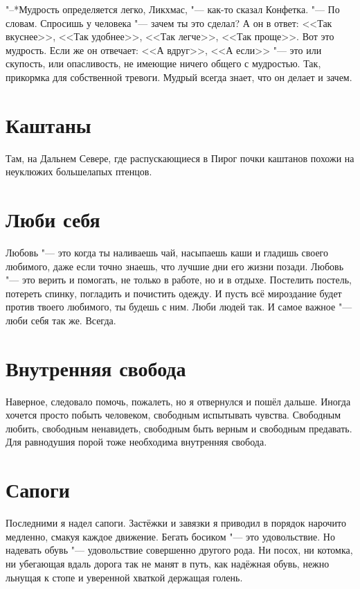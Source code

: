 \documentclass[a4paper,10pt]{book}
\begin{document}
"--*Мудрость определяется легко, Ликхмас, "--- как-то сказал Конфетка. "--- По 
словам. Спросишь у человека "--- зачем ты это сделал? А он в ответ: <<Так 
вкуснее>>, <<Так удобнее>>, <<Так легче>>, <<Так проще>>. Вот это мудрость. 
Если 
же он отвечает: <<А вдруг>>, <<А если>> "--- это или скупость, или опасливость, 
не имеющие ничего общего с мудростью. Так, прикормка для собственной тревоги. 
Мудрый всегда знает, что он делает и зачем.
 
 \section{Каштаны}

 Там, на Дальнем Севере, где распускающиеся в Пирог почки каштанов похожи на 
неуклюжих большелапых птенцов.
 
\section{Люби себя}
 
Любовь "--- это когда ты наливаешь чай, насыпаешь каши и гладишь своего 
любимого, даже если точно знаешь, что лучшие дни его жизни позади.
Любовь "--- это верить и помогать, не только в работе, но и в отдыхе. Постелить 
постель, потереть спинку, погладить и почистить одежду. И пусть всё мироздание 
будет против твоего любимого, ты будешь с ним. Люби людей так. И самое важное 
"--- люби себя так же. Всегда.
 
 \section{Внутренняя свобода}

  Наверное, следовало помочь, пожалеть, но я отвернулся и пошёл дальше. Иногда 
хочется просто побыть человеком, свободным испытывать чувства. Свободным 
любить, 
свободным ненавидеть, свободным быть верным и свободным предавать. Для 
равнодушия порой тоже необходима внутренняя свобода.
 
 \section{Сапоги}

 Последними я надел сапоги. Застёжки и завязки я приводил в порядок нарочито 
медленно, смакуя каждое движение. Бегать босиком "--- это удовольствие. Но 
надевать обувь "--- удовольствие совершенно другого рода. Ни посох, ни котомка, 
ни убегающая вдаль дорога так не манят в путь, как надёжная обувь, нежно 
льнущая к стопе и уверенной хваткой держащая голень.
 
\end{document}
